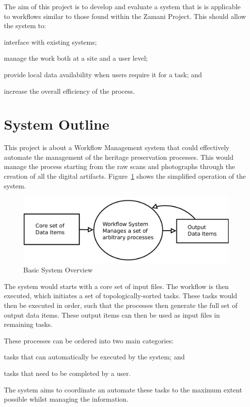     The aim of this project is to develop and evaluate a system that is is applicable
    to workflows similar to those found within the Zamani Project. This should allow the
    system to: \begin{inparaenum}[i)] \item interface with existing systems; \item manage the
    work both at a site and a user level; \item provide local data availability when users
    require it for a task; and \item increase the overall efficiency of the process.
    \end{inparaenum}

\section{System Outline}
    This project is about a Workflow Management system that could effectively
    automate the management of the heritage preservation processes.
	This would manage the process starting from the raw scans and photographs
	through the creation of all the digital artifacts. Figure~\ref{intro:basic}
	shows the simplified operation of the system.
	\begin{figure}[!h]
		\begin{center}
			\includegraphics[scale=0.34]{figures/basic_system.pdf}
		\end{center}
		\caption{Basic System Overview}
		\label{intro:basic}
	\end{figure}

	\noindent The system would starts with a
	core set of input files. The workflow is then executed, which initiates a set
	of topologically-sorted tasks. These tasks would then be executed in order, such that
    the processes then generate the full set of output data items. These output items can then
    be used as input files in remaining tasks.

    These processes can be ordered into two main categories:
    \begin{inparaenum}[(i)]
        \item tasks that can automatically be executed by the system; and
        \item tasks that need to be completed by a user.
    \end{inparaenum} The system aims to coordinate an automate these tasks to
    the maximum extent possible whilst managing the information.

